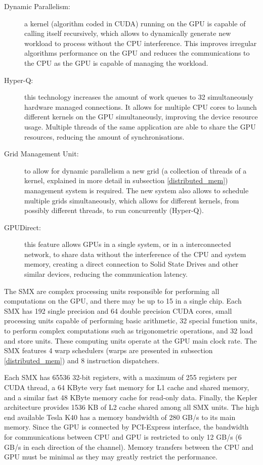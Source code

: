 \begin{description}
	\item[Dynamic Parallelism:] a kernel (algorithm coded in CUDA) running on the GPU is capable of calling itself recursively, which allows to dynamically generate new workload to process without the CPU interference. This improves irregular algorithms performance on the GPU and reduces the communications to the CPU as the GPU is capable of managing the workload.
	\item[Hyper-Q:] this technology increases the amount of work queues to 32 simultaneously hardware managed connections. It allows for multiple CPU cores to launch different kernels on the GPU simultaneously, improving the device resource usage. Multiple threads of the same application are able to share the GPU resources, reducing the amount of synchronisations.
	\item[Grid Management Unit:] to allow for dynamic parallelism a new grid (a collection of threads of a kernel, explained in more detail in subsection \ref{distributed_mem}) management system is required. The new system also allows to schedule multiple grids simultaneously, which allows for different kernels, from possibly different threads, to run concurrently (Hyper-Q).
	\item[\nvidia GPUDirect:] this feature allows GPUs in a single system, or in a interconnected network, to share data without the interference of the CPU and system memory, creating a direct connection to Solid State Drives and other similar devices, reducing the communication latency.
\end{description}

The SMX are complex processing units responsible for performing all computations on the GPU, and there may be up to 15 in a single chip. Each SMX has 192 single precision and 64 double precision CUDA cores, small processing units capable of performing basic arithmetic, 32 special function units, to perform complex computations such as trigonometric operations, and 32 load and store units. These computing units operate at the GPU main clock rate. The SMX features 4 warp schedulers (warps are presented in subsection \ref{distributed_mem}) and 8 instruction dispatchers.

Each SMX has 65536 32-bit registers, with a maximum of 255 registers per CUDA thread, a 64 KByte very fast memory for L1 cache and shared memory, and a similar fast 48 KByte memory cache for read-only data. Finally, the Kepler architecture provides 1536 KB of L2 cache shared among all SMX units. The high end available Tesla K40 has a memory bandwidth of 280 GB/s to its main memory. Since the GPU is connected by PCI-Express interface, the bandwidth for communications between CPU and GPU is restricted to only 12 GB/s (6 GB/s in each direction of the channel). Memory transfers between the CPU and GPU must be minimal as they may greatly restrict the performance.

